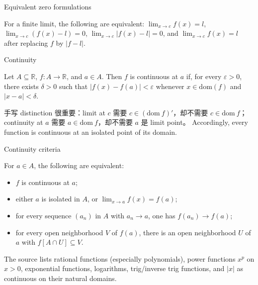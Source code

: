 \begin{theorem}{Equivalent zero formulations}

For a finite limit, the following are equivalent: \(\lim_{x\rightarrow c}f(x) = l\), \(\lim_{x\rightarrow c}\left( {f(x) - l} \right) = 0\), \(\lim_{x\rightarrow c}\left| {f(x) - l} \right| = 0\), and \(\lim_{x\rightarrow c}f(x) = l\) after replacing \(f\) by \(\left| {f - l} \right|\).

\end{theorem}

\begin{definition}{Continuity}

Let \(A \subseteq \mathbb{R}\), \(f:A\rightarrow\mathbb{R}\), and \(a \in A\). Then \(f\) is continuous at \(a\) if, for every \(\varepsilon > 0\), there exists \(\delta > 0\) such that \(\left| {f(x) - f(a)} \right| < \varepsilon\) whenever \(x \in \text{dom}(f)\) and \(\left| {x - a} \right| < \delta\).

\end{definition}

手写 distinction 很重要：limit at \(c\) 需要 \(c \in \left( {\text{dom}\ f} \right)'\)，却不需要 \(c \in \text{dom}\ f\)；continuity at \(a\) 需要 \(a \in \text{dom}\ f\)，却不需要 \(a\) 是 limit point。 Accordingly, every function is continuous at an isolated point of its domain.

\begin{theorem}{Continuity criteria}

For \(a \in A\), the following are equivalent:

\begin{itemize}
\tightlist
\item
  \(f\) is continuous at \(a\);
\item
  either \(a\) is isolated in \(A\), or \(\lim_{x\rightarrow a}f(x) = f(a)\);
\item
  for every sequence \(\left( a_{n} \right)\) in \(A\) with \(a_{n}\rightarrow a\), one has \(f\left( a_{n} \right)\rightarrow f(a)\);
\item
  for every open neighborhood \(V\) of \(f(a)\), there is an open neighborhood \(U\) of \(a\) with \(f\left\lbrack {A \cap U} \right\rbrack \subseteq V\).
\end{itemize}

\end{theorem}

The source lists rational functions (especially polynomials), power functions \(x^{p}\) on \(x > 0\), exponential functions, logarithms, trig/inverse trig functions, and \(|x|\) as continuous on their natural domains.

